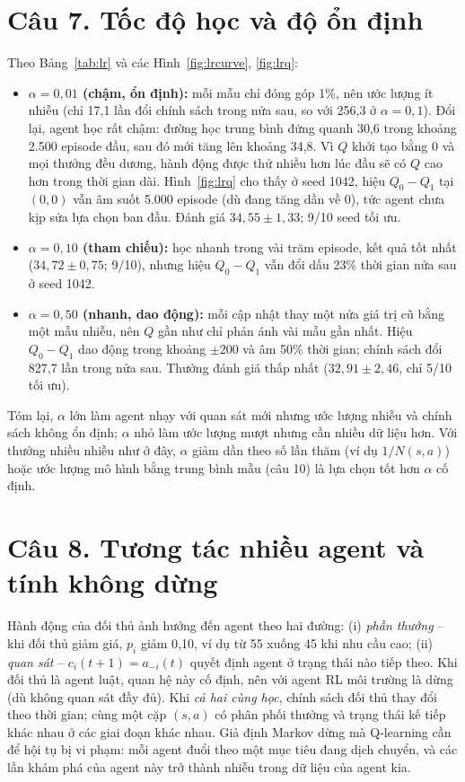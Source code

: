 \documentclass[12pt,a4paper]{report}
\begin{document}
\section*{Câu 7. Tốc độ học và độ ổn định}
Theo Bảng~\ref{tab:lr} và các Hình~\ref{fig:lrcurve}, \ref{fig:lrq}:
\begin{itemize}
\item \textbf{$\alpha=0{,}01$ (chậm, ổn định):} mỗi mẫu chỉ đóng góp 1\%, nên ước
  lượng ít nhiễu (chỉ 17{,}1 lần đổi chính sách trong nửa sau, so với 256{,}3 ở
  $\alpha=0{,}1$). Đổi lại, agent học rất chậm: đường học trung bình đứng quanh 30{,}6
  trong khoảng 2.500 episode đầu, sau đó mới tăng lên khoảng 34{,}8. Vì $Q$ khởi tạo
  bằng 0 và mọi thưởng đều dương, hành động được thử nhiều hơn lúc đầu sẽ có $Q$ cao
  hơn trong thời gian dài. Hình~\ref{fig:lrq} cho thấy ở seed 1042, hiệu
  $Q_0-Q_1$ tại $(0,0)$ vẫn âm suốt 5.000 episode (dù đang tăng dần về 0), tức agent
  chưa kịp sửa lựa chọn ban đầu. Đánh giá $34{,}55\pm1{,}33$; 9/10 seed tối ưu.
\item \textbf{$\alpha=0{,}10$ (tham chiếu):} học nhanh trong vài trăm episode, kết quả
  tốt nhất ($34{,}72\pm0{,}75$; 9/10), nhưng hiệu $Q_0-Q_1$ vẫn đổi dấu 23\% thời
  gian nửa sau ở seed 1042.
\item \textbf{$\alpha=0{,}50$ (nhanh, dao động):} mỗi cập nhật thay một nửa giá trị
  cũ bằng một mẫu nhiễu, nên $Q$ gần như chỉ phản ánh vài mẫu gần nhất. Hiệu
  $Q_0-Q_1$ dao động trong khoảng $\pm200$ và âm 50\% thời gian; chính sách đổi 827{,}7
  lần trong nửa sau. Thưởng đánh giá thấp nhất ($32{,}91\pm2{,}46$, chỉ 5/10 tối ưu).
\end{itemize}
Tóm lại, $\alpha$ lớn làm agent nhạy với quan sát mới nhưng ước lượng nhiễu và chính
sách không ổn định; $\alpha$ nhỏ làm ước lượng mượt nhưng cần nhiều dữ liệu hơn.
Với thưởng nhiều nhiễu như ở đây, $\alpha$ giảm dần theo số lần thăm (ví dụ
$1/N(s,a)$) hoặc ước lượng mô hình bằng trung bình mẫu (câu 10) là lựa chọn tốt hơn
$\alpha$ cố định.

\section*{Câu 8. Tương tác nhiều agent và tính không dừng}
Hành động của đối thủ ảnh hưởng đến agent theo hai đường: (i) \emph{phần thưởng} --
khi đối thủ giảm giá, $p_i$ giảm 0{,}10, ví dụ từ 55 xuống 45 khi nhu cầu cao;
(ii) \emph{quan sát} -- $c_i(t+1)=a_{-i}(t)$ quyết định agent ở trạng thái nào tiếp
theo. Khi đối thủ là agent luật, quan hệ này cố định, nên với agent RL môi trường
là dừng (dù không quan sát đầy đủ). Khi \emph{cả hai cùng học}, chính sách đối thủ
thay đổi theo thời gian; cùng một cặp $(s,a)$ có phân phối thưởng và trạng thái kế
tiếp khác nhau ở các giai đoạn khác nhau. Giả định Markov dừng mà Q-learning cần để
hội tụ bị vi phạm: mỗi agent đuổi theo một mục tiêu đang dịch chuyển, và các lần
khám phá của agent này trở thành nhiễu trong dữ liệu của agent kia.
\end{document}

